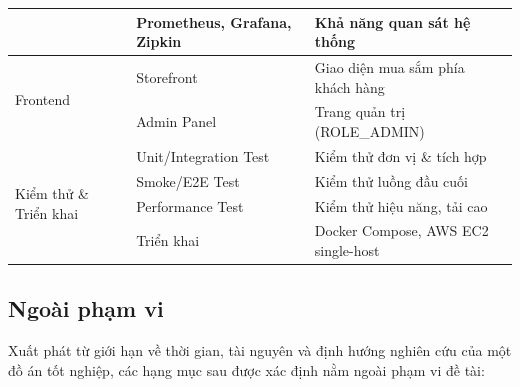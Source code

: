 \documentclass[../DoAn.tex]{subfiles}
\begin{document}
\begin{table}[H]
{\begin{tabular}{|l|l|l|}
                                     & Prometheus, Grafana, Zipkin & Khả năng quan sát hệ thống \\ \hline
\multirow{2}{2.5cm}{Frontend} & Storefront & Giao diện mua sắm phía khách hàng \\ \cline{2-3}
                              & Admin Panel & Trang quản trị (ROLE\_ADMIN) \\ \hline
\multirow{4}{2.5cm}{Kiểm thử \& Triển khai} & Unit/Integration Test & Kiểm thử đơn vị \& tích hợp \\ \cline{2-3}
                                            & Smoke/E2E Test & Kiểm thử luồng đầu cuối \\ \cline{2-3}
                                            & Performance Test & Kiểm thử hiệu năng, tải cao \\ \cline{2-3}
                                            & Triển khai & Docker Compose, AWS EC2 single-host \\ \hline
\end{tabular}
}
\end{table}

\subsection*{Ngoài phạm vi}

Xuất phát từ giới hạn về thời gian, tài nguyên và định hướng nghiên cứu của một đồ án tốt
nghiệp, các hạng mục sau được xác định nằm ngoài phạm vi đề tài:
\end{document}
